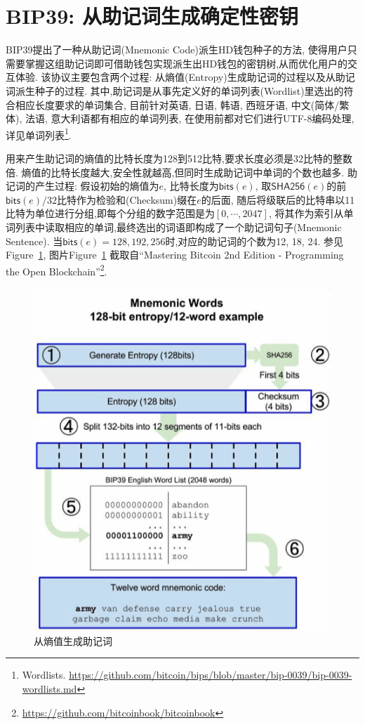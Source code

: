 \section{BIP39: 从助记词生成确定性密钥}

BIP39提出了一种从助记词(Mnemonic Code)派生HD钱包种子的方法,
使得用户只需要掌握这组助记词即可借助钱包实现派生出HD钱包的密钥树,从而优化用户的交互体验.  
该协议主要包含两个过程: 从熵值(Entropy)生成助记词的过程以及从助记词派生种子的过程.
其中,助记词是从事先定义好的单词列表(Wordlist)里选出的符合相应长度要求的单词集合,
目前针对英语, 日语, 韩语, 西班牙语, 中文(简体/繁体), 法语, 意大利语都有相应的单词列表,
在使用前都对它们进行UTF-8编码处理,详见单词列表\footnote{Wordlists. 
\url{https://github.com/bitcoin/bips/blob/master/bip-0039/bip-0039-wordlists.md}}.

用来产生助记词的熵值的比特长度为128到512比特,要求长度必须是32比特的整数倍.
熵值的比特长度越大,安全性就越高,但同时生成助记词中单词的个数也越多.
助记词的产生过程: 假设初始的熵值为$e$, 比特长度为$\textsf{bits}(e)$,
取$\textsf{SHA256}(e)$的前$\textsf{bits}(e)/32$比特作为检验和(Checksum)缀在$e$的后面,
随后将级联后的比特串以11比特为单位进行分组,即每个分组的数字范围是为$[0,\cdots,2047]$,
将其作为索引从单词列表中读取相应的单词,最终选出的词语即构成了一个助记词句子(Mnemonic Sentence).
当$\textsf{bits}(e)=128,192,256$时,对应的助记词的个数为12, 18, 24.
参见Figure~\ref{fig-entropy2mnemonic}, 图片Figure~\ref{fig-entropy2mnemonic}
截取自``Mastering Bitcoin 2nd Edition - Programming the Open Blockchain''\footnote{
\url{https://github.com/bitcoinbook/bitcoinbook}}.

\begin{figure}[h]
\centering
\includegraphics[width=.5\textwidth]{./entropy2mnemonic.png}
\caption{从熵值生成助记词}\label{fig-entropy2mnemonic}
\end{figure}

